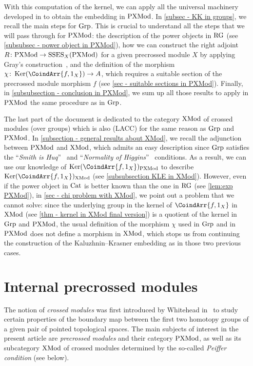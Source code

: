 \documentclass[a4paper, british, reqno]{amsart}
\DeclareMathOperator{\Ker}{Ker} %
\renewcommand*{\and}{,}
\renewcommand*{\and}{,}
\newcommand*{\CatName}[1]{\textnormal{#1}}
\newcommand*{\CondName}[1]{\textnormal{(#1)}}
\newcommand*{\Grp}{\CatName{Grp}}
\newcommand*{\PXMod}{\CatName{PXMod}}
\newcommand*{\XMod}{\CatName{XMod}}
\newcommand*{\RG}{\CatName{RG}}
\newcommand*{\Cat}{\CatName{Cat}}
\newcommand*{\SSES}{\CatName{SSES}}
\newcommand*{\LACC}{\CondName{LACC}}
\theoremstyle{definition}
\theoremstyle{remark}
\begin{document}
With this computation of the kernel, we can apply all the universal machinery developed in \cite{DGMVdL} to obtain the embedding in \(\PXMod\). In \cref{subsec - KK in groups}, we recall the main steps for \(\Grp\). This is crucial to understand all the steps that we will pass through for \(\PXMod\): the description of the power objects in \(\RG\) (see \cref{subsubsec - power object in PXMod}), how we can construct the right adjoint \(R\colon \PXMod\to \SSES_X(\PXMod)\) for a given precrossed module \(X\) by applying Gray's construction~\cite[Proposition~5.3]{Gra12}, and the definition of the morphism \(\chi\colon \Ker(\CoindArr{f\and 1_X})\to A\), which requires a suitable section of the precrossed module morphism \(f\) (see \cref{sec - suitable sections in PXMod}). Finally, in \cref{subsubsection - conclusion in PXMod}, we sum up all those results to apply in \(\PXMod\) the same procedure as in \(\Grp\).

The last part of the document is dedicated to the category \(\XMod\) of crossed modules (over groups) which is also \LACC{} for the same reason as \(\Grp\) and \(\PXMod\). In \cref{subsection - general results about XMod}, we recall the adjunction between \(\PXMod\) and \(\XMod\), which admits an easy description since \(\Grp\) satisfies the ``\emph{Smith is Huq}''~\cite{MVdL12} and ``\emph{Normality of Higgins}''~\cite{AlanThesis} conditions. As a result, we can use our knowledge of \(\Ker(\CoindArr{f\and 1_X})_{\PXMod}\) to describe \(\Ker(\CoindArr{f\and 1_X})_{\XMod}\) (see \cref{subsubsection KLE in XMod}). However, even if the power object in \(\Cat\) is better known than the one in \(\RG\) (see \cref{lem:exp PXMod}), in \cref{sec - chi problem with XMod}, we point out a problem that we cannot solve: since the underlying group in the kernel of \(\CoindArr{f\and 1_X}\) in \(\XMod\) (see \cref{thm - kernel in XMod final version}) is a quotient of the kernel in \(\Grp\) and \(\PXMod\), the usual definition of the morphism \(\chi\) used in \(\Grp\) and in \(\PXMod\) does not define a morphism in \(\XMod\), which stops us from continuing the construction of the Kaluzhnin--Krasner embedding as in those two previous cases.


\section{Internal precrossed modules}
\label{subsec - definitions}
The notion of \emph{crossed modules} was first introduced by Whitehead in~\cite{W49} to study certain properties of the boundary map between the first two homotopy groups of a given pair of pointed topological spaces. The main subjects of interest in the present article are \emph{precrossed modules} and their category \(\PXMod\), as well as its subcategory \(\XMod\) of crossed modules determined by the so-called \emph{Peiffer condition} (see below).
\end{document}
